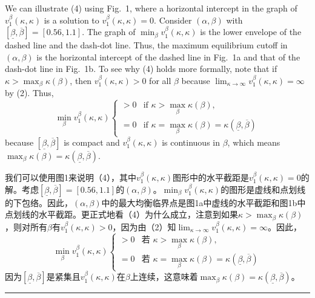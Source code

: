 \documentclass[12pt,a4paper]{article}
\newenvironment{original}
  {\par\medskip\noindent\color{black}\ignorespaces}
  {\par\medskip}
\newenvironment{translation}
  {\par\noindent\color{darkblue}\ignorespaces}
  {\par\medskip\noindent\hrule\par\medskip}
\theoremstyle{definition}
\theoremstyle{remark}
\begin{document}
\begin{original}
We can illustrate (4) using Fig.\ 1, where a horizontal intercept in the graph of $v_1^\beta(\kappa, \kappa)$ is a solution to $v_1^\beta(\kappa, \kappa) = 0$. Consider $(\alpha, \beta)$ with $[\underline{\beta}, \overline{\beta}] = [0.56, 1.1]$. The graph of $\min_{\beta} v_1^\beta(\kappa, \kappa)$ is the lower envelope of the dashed line and the dash-dot line. Thus, the maximum equilibrium cutoff in $(\alpha, \beta)$ is the horizontal intercept of the dashed line in Fig.\ 1a and that of the dash-dot line in Fig.\ 1b. To see why (4) holds more formally, note that if $\kappa > \max_{\beta} \kappa(\beta)$, then $v_1^\beta(\kappa, \kappa) > 0$ for all $\beta$ because $\lim_{\kappa \to \infty} v_1^\beta(\kappa, \kappa) = \infty$ by (2). Thus,
\[
\min_{\beta} v_1^\beta(\kappa, \kappa)
\begin{cases}
> 0 & \text{if } \kappa > \max_{\beta} \kappa(\beta),\\
= 0 & \text{if } \kappa = \max_{\beta} \kappa(\beta) = \kappa(\underline{\beta}, \overline{\beta})
\end{cases}
\]
because $[\underline{\beta}, \overline{\beta}]$ is compact and $v_1^\beta(\kappa, \kappa)$ is continuous in $\beta$, which means $\max_{\beta} \kappa(\beta) = \kappa(\underline{\beta}, \overline{\beta})$.
\end{original}
\begin{translation}
我们可以使用图1来说明（4），其中$v_1^\beta(\kappa, \kappa)$图形中的水平截距是$v_1^\beta(\kappa, \kappa) = 0$的解。考虑$[\underline{\beta}, \overline{\beta}] = [0.56, 1.1]$的$(\alpha, \beta)$。$\min_{\beta} v_1^\beta(\kappa, \kappa)$的图形是虚线和点划线的下包络。因此，$(\alpha, \beta)$中的最大均衡临界点是图1a中虚线的水平截距和图1b中点划线的水平截距。更正式地看（4）为什么成立，注意到如果$\kappa > \max_{\beta} \kappa(\beta)$，则对所有$\beta$有$v_1^\beta(\kappa, \kappa) > 0$，因为由（2）知$\lim_{\kappa \to \infty} v_1^\beta(\kappa, \kappa) = \infty$。因此，
\[
\min_{\beta} v_1^\beta(\kappa, \kappa)
\begin{cases}
> 0 & \text{若 } \kappa > \max_{\beta} \kappa(\beta),\\
= 0 & \text{若 } \kappa = \max_{\beta} \kappa(\beta) = \kappa(\underline{\beta}, \overline{\beta})
\end{cases}
\]
因为$[\underline{\beta}, \overline{\beta}]$是紧集且$v_1^\beta(\kappa, \kappa)$在$\beta$上连续，这意味着$\max_{\beta} \kappa(\beta) = \kappa(\underline{\beta}, \overline{\beta})$。
\end{translation}
\end{document}
